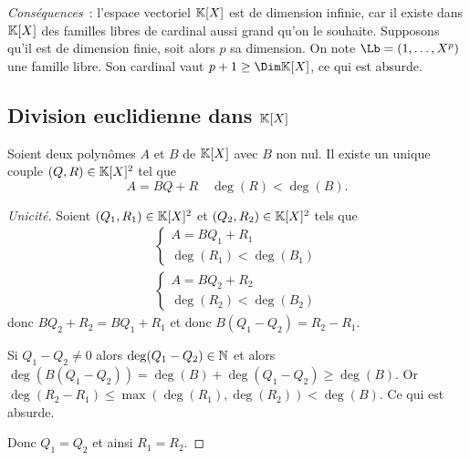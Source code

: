 \emph{Conséquences}~: l'espace vectoriel $\mathbb{K}[X]$ est de dimension infinie, car il existe dans $\mathbb{K}[X]$ des familles libres de cardinal aussi grand qu'on le souhaite. Supposons qu'il est de dimension finie, soit alors $p$ sa dimension. On note $\Lb=(1, \ldots, X^p)$ une famille libre. Son cardinal vaut $p+1 \geq \Dim \K[X]$, ce qui est absurde.

\subsection{Division euclidienne dans $\mathbb{K}[X]$}

\begin{theo}
  Soient deux polynômes $A$ et $B$ de $\mathbb{K}[X]$ avec $B$ non nul. Il existe un unique couple $(Q,R) \in \mathbb{K}[X]^2$ tel que
  \begin{equation}
    A=BQ+R \quad \deg(R) < \deg(B).
  \end{equation}
\end{theo}
\begin{proof}[Unicité]
  Soient $(Q_1,R_1) \in \mathbb{K}[X]^2$ et $(Q_2,R_2) \in \mathbb{K}[X]^2$ tels que
  \begin{align}
    \begin{cases}
      A=BQ_1+R_1 \\ \deg(R_1) < \deg(B_1)
    \end{cases}\\
    \begin{cases}
      A=BQ_2+R_2 \\ \deg(R_2) < \deg(B_2)
    \end{cases}
  \end{align}
  donc $BQ_2+R_2 = BQ_1+R_1$ et donc $B(Q_1-Q_2) = R_2-R_1$.

  Si $Q_1-Q_2 \neq 0$ alors $\deg(Q_1-Q_2) \in \mathbb{N}$ et alors $\deg(B(Q_1-Q_2)) = \deg(B) + \deg(Q_1-Q_2) \geq \deg(B)$. Or $\deg(R_2-R_1) \leq \max(\deg(R_1),\deg(R_2)) < \deg(B)$. Ce qui est absurde. 

  Donc $Q_1=Q_2$ et ainsi $R_1=R_2$.
\end{proof}
